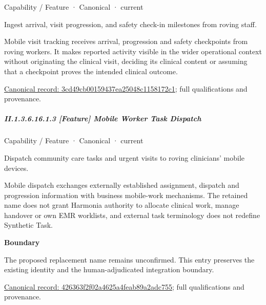 \label{element:3cd49cb00159437ea25048c1158172c1}
{\small Capability / Feature · Canonical · current}\par

Ingest arrival, visit progression, and safety check-in milestones from roving staff.



Mobile visit tracking receives arrival, progression and safety checkpoints from roving workers. It makes reported activity visible in the wider operational context without originating the clinical visit, deciding its clinical content or assuming that a checkpoint proves the intended clinical outcome.


{\footnotesize \href{../../../../../../../continuum/strategy/capability/feature/3cd49cb00159437ea25048c1158172c1.md}{Canonical record: 3cd49cb00159437ea25048c1158172c1}; full qualifications and provenance.}\par
\subparagraph*{II.1.3.6.16.1.3 [Feature] Mobile Worker Task Dispatch}
\label{navigation:II.1.3.6.16.1.3}

\label{element:426363f2f02a4625a4feab89a2adc755}
{\small Capability / Feature · Canonical · current}\par

Dispatch community care tasks and urgent visits to roving clinicians' mobile devices.



Mobile dispatch exchanges externally established assignment, dispatch and progression information with business mobile-work mechanisms. The retained name does not grant Harmonia authority to allocate clinical work, manage handover or own EMR worklists, and external task terminology does not redefine Synthetic Task.



\textbf{Boundary}



The proposed replacement name remains unconfirmed. This entry preserves the existing identity and the human-adjudicated integration boundary.


{\footnotesize \href{../../../../../../../continuum/strategy/capability/feature/426363f2f02a4625a4feab89a2adc755.md}{Canonical record: 426363f2f02a4625a4feab89a2adc755}; full qualifications and provenance.}\par
